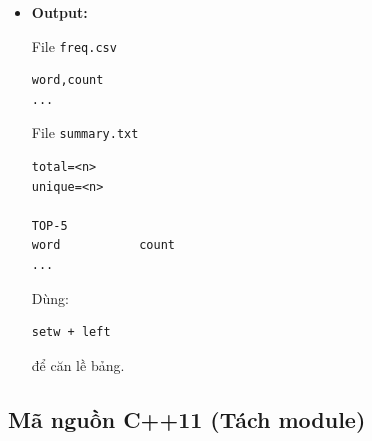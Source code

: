 \begin{itemize}
\begin{itemize}
        \item \textbf{Module 7 (Ghi file):}

        \begin{itemize}
            \item Hàm \texttt{writeFreq()}
            \item Hàm \texttt{writeSummary()}
        \end{itemize}

    \end{itemize}

    \item \textbf{Output:}

    File \texttt{freq.csv}

\begin{lstlisting}
word,count
...
\end{lstlisting}

    File \texttt{summary.txt}

\begin{lstlisting}
total=<n>
unique=<n>

TOP-5
word           count
...
\end{lstlisting}

    Dùng:
\begin{lstlisting}
setw + left
\end{lstlisting}

    để căn lề bảng.

\end{itemize}

\subsection{Mã nguồn C++11 (Tách module)}

